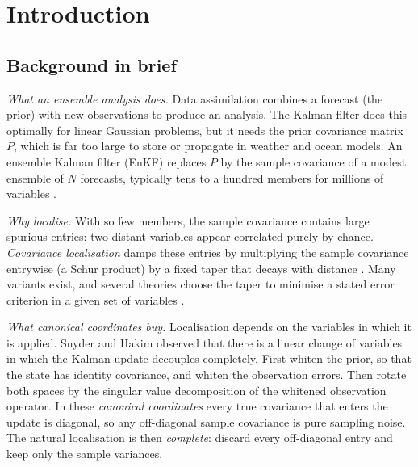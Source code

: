 \documentclass[11pt,a4paper]{article}
\numberwithin{equation}{section}
\theoremstyle{remark}\newtheorem{remark}[theorem]{Remark}
\begin{document}
\begin{abstract}
\emph{Snyder and Hakim's test case.} In a reconstruction of their 200-variable example,
symmetric (ZCA) whitening or the best basis found removes about 54\% of the canonical basis's
excess error over the Kalman filter at \(N=8\) (a reduction of 0.074 in MSE relative to the
Kalman filter), roughly equivalent to doubling the ensemble; under prior-normalised loss the
canonical basis is the best found. Proofs are not machine-verified; exact-arithmetic and
floating-point checks are distinguished throughout.
\end{abstract}

\tableofcontents

\section{Introduction}\label{sec:intro}

\subsection{Background in brief}

\emph{What an ensemble analysis does.} Data assimilation combines a forecast (the prior)
with new observations to produce an analysis. The Kalman filter does this optimally for
linear Gaussian problems, but it needs the prior covariance matrix \(P\), which is far too
large to store or propagate in weather and ocean models. An ensemble Kalman filter (EnKF)
replaces \(P\) by the sample covariance of a modest ensemble of \(N\) forecasts, typically
tens to a hundred members for millions of variables \cite{HoutekamerZhang2016}.

\emph{Why localise.} With so few members, the sample covariance contains large spurious
entries: two distant variables appear correlated purely by chance. \emph{Covariance
localisation} damps these entries by multiplying the sample covariance entrywise (a Schur
product) by a fixed taper that decays with distance \cite{HoutekamerZhang2016}. Many
variants exist, and several theories choose the taper to minimise a stated error
criterion in a given set of variables
\cite{Flowerdew2015,Menetrier2015a,Perianez2014,MorzfeldHodyss2023}.

\emph{What canonical coordinates buy.} Localisation depends on the variables in which it
is applied. Snyder and Hakim \cite{SnyderHakim2022} observed that there is a linear change
of variables in which the Kalman update decouples completely. First whiten the prior, so
that the state has identity covariance, and whiten the observation errors. Then rotate
both spaces by the singular value decomposition of the whitened observation operator. In
these \emph{canonical coordinates} every true covariance that enters the update is
diagonal, so any off-diagonal sample covariance is pure sampling noise. The natural
localisation is then \emph{complete}: discard every off-diagonal entry and keep only the
sample variances.
\end{document}
